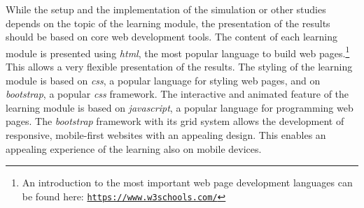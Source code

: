 \documentclass[12pt]{article}
\begin{document}
%
%
%

While the setup and the implementation of the simulation or other studies depends on the topic of the learning module, the presentation of the results should be based on core web development tools. 
%
The content of each learning module is presented using \emph{html}, the most popular language to build web pages.\footnote{An introduction to the most important web page development languages can be found here: \href{https://www.w3schools.com/}{\texttt{https://www.w3schools.com/}}} 
%
This allows a very flexible presentation of the results. 
%
The styling of the learning module is based on \emph{css}, a popular language for styling web pages, and on \emph{bootstrap}, a popular \emph{css} framework. 
%
The interactive and animated feature of the learning module is based on \emph{javascript}, a popular language for programming web pages. 
%
The \emph{bootstrap} framework with its grid system allows the development of responsive, mobile-first websites with an appealing design. 
%
This enables an appealing experience of the learning also on mobile devices. 
\end{document}
